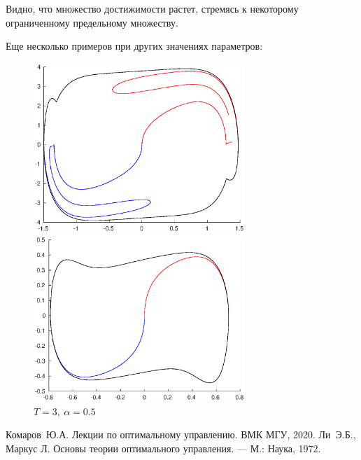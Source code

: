 \documentclass[16pt]{article}
\begin{document}
Видно, что множество достижимости растет, стремясь к некоторому ограниченному предельному множеству.

Еще несколько примеров при других значениях параметров:


\begin{figure}[h]
\begin{multicols}{2}
	\hfill
\includegraphics[width=80mm]{19_5.eps}
	\hfill
\caption{$T = 1.9,\ \alpha = 5$}
	\hfill
\includegraphics[width=80mm]{3_05.eps}
	\hfill
\caption{$T = 3,\ \alpha = 0.5$}
    \hfill
\end{multicols}
\end{figure}

\newpage
\begin{thebibliography}{0}
	Комаров~Ю.А. Лекции по оптимальному управлению. ВМК МГУ, 2020. 
	Ли~Э.Б., Маркус Л. Основы теории оптимального управления. --- М.: Наука, 1972.
\end{thebibliography}
\end{document}
